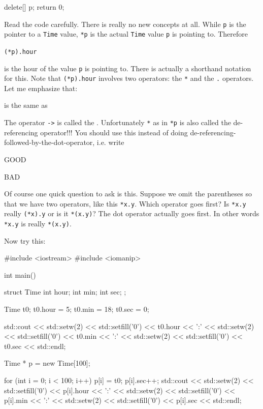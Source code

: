 \begin{center}
\begin{center}
\begin{consolethree}[escapeinside=||]
{    delete[] p;
    return 0;
}
\end{consolethree}

Read the code carefully. There is really no new concepts at all. While \texttt{p}
is the pointer to a \texttt{Time} value, \verb!*p! is the actual \texttt{Time} value \texttt{p} is pointing
to. Therefore

\verb!(*p).hour!

is the hour of the value \texttt{p} is pointing to. There is actually a shorthand
notation for this. Note that \verb!(*p).hour! involves two operators: the \texttt{*} and
the \texttt{.} operators. Let me emphasize that:


is the same as


The operator \texttt{->} is called the .
Unfortunately \texttt{*} as in \verb!*p! is also called the de-referencing operator!!! You
should use this instead of doing de-referencing-followed-by-the-dot-operator, i.e. write

 \hspace{1cm} GOOD

 \hspace{1cm} BAD

Of course one quick question to ask is this. Suppose we omit the
parentheses so that we have two operators, like this \verb!*x.y!. Which
operator goes first? Is \verb!*x.y! really \verb!(*x).y! or is it \verb!*(x.y)!? The dot
operator actually goes first. In other words \verb!*x.y! is really \verb!*(x.y)!.


Now try this:

\begin{consolethree}[escapeinside=||]
#include <iostream>
#include <iomanip>

int main()
{
  struct Time
  {
    int hour;
    int min;
    int sec;
  };

  Time t0;
  t0.hour = 5;
  t0.min = 18;
  t0.sec = 0;

  std::cout
    << std::setw(2) << std::setfill('0') << t0.hour
    << ':'
    << std::setw(2) << std::setfill('0') << t0.min
    << ':'
    << std::setw(2) << std::setfill('0') << t0.sec
    << std::endl;

  Time * p = new Time[100];

  for (int i = 0; i < 100; i++)
  {
    p[i] = t0;
    p[i].sec++;
    std::cout
      << std::setw(2) << std::setfill('0') << p[i].hour
      << ':'
      << std::setw(2) << std::setfill('0') << p[i].min
      << ':'
      << std::setw(2) << std::setfill('0') << p[i].sec
      << std::endl;
  }

}
\end{consolethree}
\end{center}
\end{center}
